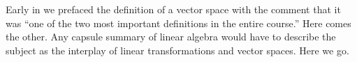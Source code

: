 %
\begin{introduction}
\begin{para}Early in  we prefaced the definition of a vector space with the comment that it was ``one of the two most important definitions in the entire course.''  Here comes the other.  Any capsule summary of linear algebra would have to describe the subject as the interplay of linear transformations and vector spaces.  Here we go.\end{para}
\end{introduction}
%
